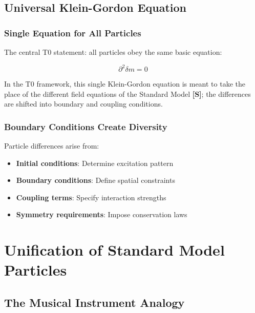	\subsection{Universal Klein-Gordon Equation}
	\label{subsec:universal_klein_gordon}
	
	\subsubsection{Single Equation for All Particles}
	\label{subsubsec:single_equation}
	
	The central T0 statement: all particles obey the same basic equation:
	
	\begin{equation}
		\boxed{\partial^2 \delta m = 0}
		\label{eq:universal_equation}
	\end{equation}
	
	In the T0 framework, this single Klein-Gordon equation is meant to take the place of the different field equations of the Standard Model \textbf{[S]}; the differences are shifted into boundary and coupling conditions.
	
	\subsubsection{Boundary Conditions Create Diversity}
	\label{subsubsec:boundary_conditions}
	
	Particle differences arise from:
	\begin{itemize}
		\item \textbf{Initial conditions}: Determine excitation pattern
		\item \textbf{Boundary conditions}: Define spatial constraints  
		\item \textbf{Coupling terms}: Specify interaction strengths
		\item \textbf{Symmetry requirements}: Impose conservation laws
	\end{itemize}
	
	\section{Unification of Standard Model Particles}
	\label{sec:sm_unification}
	
	\subsection{The Musical Instrument Analogy}
	\label{subsec:musical_analogy}
	
